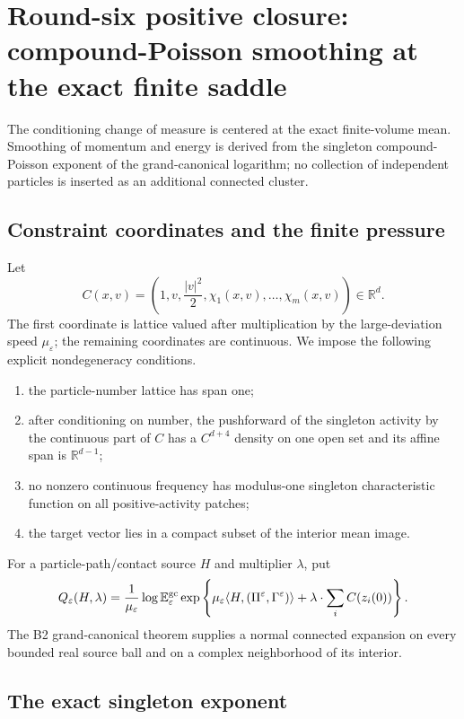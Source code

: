 \section{Round-six positive closure: compound-Poisson smoothing at the exact finite saddle}
\label{sec:r6-b1}

The conditioning change of measure is centered at the exact finite-volume
mean.  Smoothing of momentum and energy is derived from the singleton
compound-Poisson exponent of the grand-canonical logarithm; no collection of
independent particles is inserted as an additional connected cluster.

\subsection{Constraint coordinates and the finite pressure}

Let
\[
C(x,v)=\left(1,v,\frac{|v|^2}{2},\chi_1(x,v),\ldots,\chi_m(x,v)\right)
\in\mathbb R^d.
\]
The first coordinate is lattice valued after multiplication by the
large-deviation speed \(\mu_\varepsilon\); the remaining coordinates are
continuous.  We impose the following explicit nondegeneracy conditions.

\begin{enumerate}[label=(C\arabic*)]
\item the particle-number lattice has span one;
\item after conditioning on number, the pushforward of the singleton activity
by the continuous part of \(C\) has a \(C^{d+4}\) density on one open set and
its affine span is \(\mathbb R^{d-1}\);
\item no nonzero continuous frequency has modulus-one singleton
characteristic function on all positive-activity patches;
\item the target vector lies in a compact subset of the interior mean image.
\end{enumerate}

For a particle-path/contact source \(H\) and multiplier \(\lambda\), put
\[
Q_\varepsilon(H,\lambda)=
\frac1{\mu_\varepsilon}
\log\mathbb E_\varepsilon^{\rm gc}
\exp\left\{
\mu_\varepsilon\langle H,(\Pi^\varepsilon,\Gamma^\varepsilon)\rangle
+\lambda\cdot\sum_iC(z_i(0))
\right\}.
\]
The B2 grand-canonical theorem supplies a normal connected expansion on every
bounded real source ball and on a complex neighborhood of its interior.

\subsection{The exact singleton exponent}

